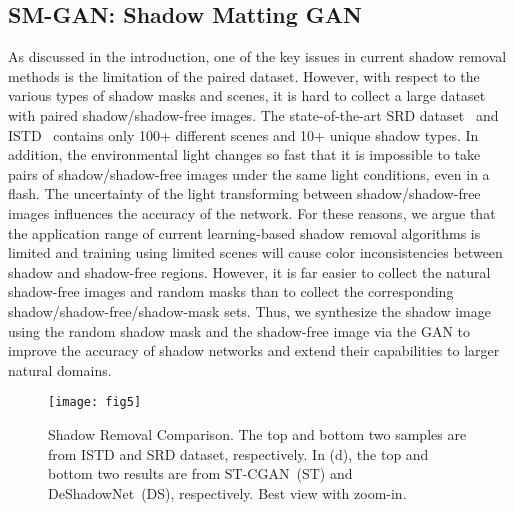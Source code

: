 \documentclass[letterpaper]{article} \usepackage{aaai20}  \usepackage{times}  \usepackage{helvet} \usepackage{courier}  \usepackage[hyphens]{url}  \urlstyle{rm} \def\UrlFont{\rm}  \usepackage{graphicx}  \frenchspacing  \setlength{\pdfpagewidth}{8.5in}  \setlength{\pdfpageheight}{11in}  \usepackage{amssymb}
\begin{document}
\subsection{SM-GAN: Shadow Matting GAN}
 As discussed in the introduction, one of the key issues in current shadow removal methods is the limitation of the paired dataset. However, with respect to the various types of shadow masks and scenes, it is hard to collect a large dataset with paired shadow/shadow-free images. The state-of-the-art SRD dataset~\cite{qu2017deshadownet} and ISTD~\cite{wang2018stacked} contains only 100+ different scenes and 10+ unique shadow types. In addition,
the environmental light changes so fast that it is impossible to take pairs of shadow/shadow-free images under the same light conditions, even in a flash. The uncertainty of the light transforming between shadow/shadow-free images influences the accuracy of the network. For these reasons, we argue that the application range of current learning-based shadow removal algorithms is limited and training using limited scenes will cause color inconsistencies between shadow and shadow-free regions. However, it is far easier to collect the natural shadow-free images and random masks than to collect the corresponding shadow/shadow-free/shadow-mask sets. Thus, we synthesize the shadow image using the random shadow mask and the shadow-free image via the GAN to improve the accuracy of shadow networks and extend their capabilities to larger natural domains. 

\begin{figure*}[t]
\centering     \texttt{[image: fig5]}
\caption{Shadow Removal Comparison. The top and bottom two samples are from ISTD and SRD dataset, respectively. In (d), the top and bottom two results are from ST-CGAN~(ST) and DeShadowNet~(DS), respectively. Best view with zoom-in.}
\label{fig:srd}
\end{figure*}
\end{document}
